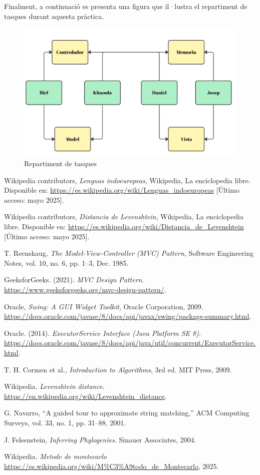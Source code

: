 \documentclass{ieeetj}
\begin{document}
Finalment, a continuació es presenta una figura que il·lustra el repartiment de tasques durant aquesta pràctica.


\begin{figure}[H]
    \centering
    \includegraphics[width=0.5\linewidth]{png/Repartiment.jpg}
    \caption{Repartiment de tasques}
    \label{fig:enter-label}
\end{figure}


\begin{thebibliography}{9}

Wikipedia contributors, \textit{Lenguas indoeuropeas}, Wikipedia, La enciclopedia libre. Disponible en: \url{https://es.wikipedia.org/wiki/Lenguas_indoeuropeas} [Último acceso: mayo 2025].

Wikipedia contributors, \textit{Distancia de Levenshtein}, Wikipedia, La enciclopedia libre. Disponible en: \url{https://es.wikipedia.org/wiki/Distancia_de_Levenshtein} [Último acceso: mayo 2025].

T. Reenskaug, \textit{The Model-View-Controller (MVC) Pattern}, Software Engineering Notes, vol. 10, no. 6, pp. 1–3, Dec. 1985.

GeeksforGeeks. (2021). \textit{MVC Design Pattern}. \\ \url{https://www.geeksforgeeks.org/mvc-design-pattern/}.

Oracle, \textit{Swing: A GUI Widget Toolkit}, Oracle Corporation, 2009. \\ \url{https://docs.oracle.com/javase/8/docs/api/javax/swing/package-summary.html}.

Oracle. (2014). \textit{ExecutorService Interface (Java Platform SE 8)}. \\ \url{https://docs.oracle.com/javase/8/docs/api/java/util/concurrent/ExecutorService.html}.

T. H. Cormen et al., \textit{Introduction to Algorithms}, 3rd ed. MIT Press, 2009.

Wikipedia. \textit{Levenshtein distance}. \\ \url{https://en.wikipedia.org/wiki/Levenshtein_distance}.

G. Navarro, “A guided tour to approximate string matching,” ACM Computing Surveys, vol. 33, no. 1, pp. 31–88, 2001.

J. Felsenstein, \textit{Inferring Phylogenies}. Sinauer Associates, 2004.

Wikipedia. \textit{Metode de montecarlo} \url{https://es.wikipedia.org/wiki/M%C3%A9todo_de_Montecarlo}, 2025.

\end{thebibliography}
\end{document}
